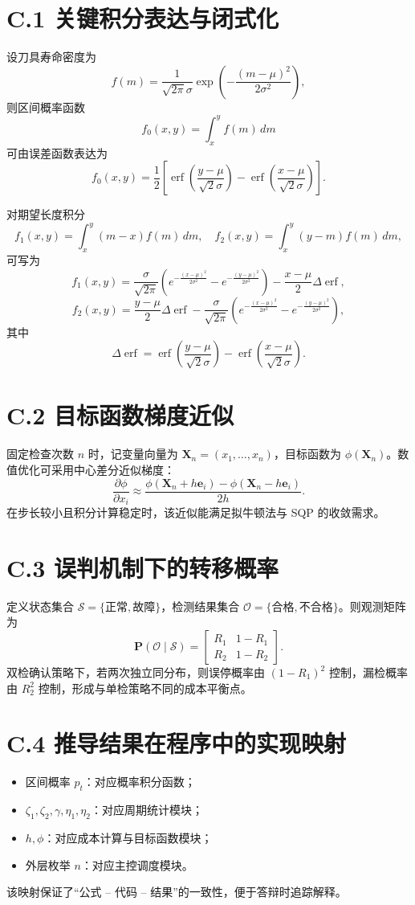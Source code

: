 \section*{C.1 关键积分表达与闭式化}
设刀具寿命密度为
\[
f(m)=\frac{1}{\sqrt{2\pi}\sigma}\exp\left(-\frac{(m-\mu)^2}{2\sigma^2}\right),
\]
则区间概率函数
\[
f_0(x,y)=\int_x^y f(m)\,dm
\]
可由误差函数表达为
\[
f_0(x,y)=\frac{1}{2}\left[\operatorname{erf}\!\left(\frac{y-\mu}{\sqrt2\sigma}\right)-\operatorname{erf}\!\left(\frac{x-\mu}{\sqrt2\sigma}\right)\right].
\]

对期望长度积分
\[
f_1(x,y)=\int_x^y(m-x)f(m)\,dm,\quad
f_2(x,y)=\int_x^y(y-m)f(m)\,dm,
\]
可写为
\[
f_1(x,y)=\frac{\sigma}{\sqrt{2\pi}}\!\left(e^{-\frac{(x-\mu)^2}{2\sigma^2}}-e^{-\frac{(y-\mu)^2}{2\sigma^2}}\right)-\frac{x-\mu}{2}\Delta\operatorname{erf},
\]
\[
f_2(x,y)=\frac{y-\mu}{2}\Delta\operatorname{erf}-\frac{\sigma}{\sqrt{2\pi}}\!\left(e^{-\frac{(x-\mu)^2}{2\sigma^2}}-e^{-\frac{(y-\mu)^2}{2\sigma^2}}\right),
\]
其中
\[
\Delta\operatorname{erf}=\operatorname{erf}\!\left(\frac{y-\mu}{\sqrt2\sigma}\right)-\operatorname{erf}\!\left(\frac{x-\mu}{\sqrt2\sigma}\right).
\]

\section*{C.2 目标函数梯度近似}
固定检查次数 $n$ 时，记变量向量为 $\mathbf X_n=(x_1,\dots,x_n)$，目标函数为 $\phi(\mathbf X_n)$。数值优化可采用中心差分近似梯度：
\[
\frac{\partial \phi}{\partial x_i}\approx \frac{\phi(\mathbf X_n+h\mathbf e_i)-\phi(\mathbf X_n-h\mathbf e_i)}{2h}.
\]
在步长较小且积分计算稳定时，该近似能满足拟牛顿法与 SQP 的收敛需求。

\section*{C.3 误判机制下的转移概率}
定义状态集合 $\mathcal S=\{\text{正常},\text{故障}\}$，检测结果集合 $\mathcal O=\{\text{合格},\text{不合格}\}$。则观测矩阵为
\[
\mathbf P(\mathcal O\mid\mathcal S)=
\begin{bmatrix}
R_1 & 1-R_1\\
R_2 & 1-R_2
\end{bmatrix}.
\]
双检确认策略下，若两次独立同分布，则误停概率由 $(1-R_1)^2$ 控制，漏检概率由 $R_2^2$ 控制，形成与单检策略不同的成本平衡点。

\section*{C.4 推导结果在程序中的实现映射}
\begin{itemize}
  \item 区间概率 $p_t$：对应概率积分函数；
  \item $\zeta_1,\zeta_2,\gamma,\eta_1,\eta_2$：对应周期统计模块；
  \item $h,\phi$：对应成本计算与目标函数模块；
  \item 外层枚举 $n$：对应主控调度模块。
\end{itemize}
该映射保证了“公式 -- 代码 -- 结果”的一致性，便于答辩时追踪解释。
